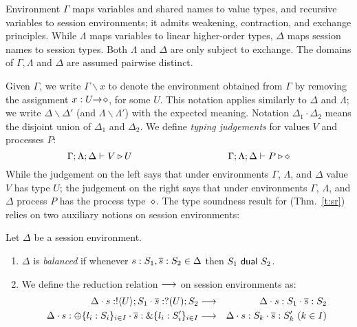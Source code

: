 Environment $\Gamma$ maps variables and shared names to value types, and recursive 
variables to session environments;  
it admits weakening, contraction, and exchange principles.
While  $\Lambda$ maps variables to 
 linear %
higher-order
types, $\Delta$ maps
session names to session types. 
Both $\Lambda$ and $\Delta$ %
are
only subject to exchange.  
The domains of $\Gamma,
\Lambda$ and $\Delta$ are assumed pairwise distinct. 

Given $\Gamma$, we write $\Gamma \backslash x$ to denote the environment obtained from 
 $\Gamma$ by removing the assignment $x:U\!\! \rightarrow\! \diamond$, for some $U$.
This notation applies similarly to $\Delta$ and $\Lambda$; 
we write $\Delta \backslash \Delta'$ (and $\Lambda \backslash \Lambda'$) with the expected meaning.
Notation
$\Delta_1\cdot \Delta_2$ means 
the disjoint union of $\Delta_1$ and $\Delta_2$.  
We define \emph{typing judgements} for values $V$
and processes $P$:
	$$\Gamma; \Lambda; \Delta \vdash V \triangleright U \qquad \qquad \qquad \qquad \qquad \Gamma; \Lambda; \Delta \vdash P \triangleright \diamond$$
While the judgement on the left
says that under environments $\Gamma$, $\Lambda$, and $\Delta$ value $V$
has type $U$; the  judgement on the right says that under
environments $\Gamma$, $\Lambda$, and $\Delta$ process $P$ has the process type~$\diamond$.
The type soundness result for \HOp (Thm.~\ref{t:sr})
relies on two auxiliary notions on session environments: 


\begin{definition}\label{d:wtenvred}%
	Let $\Delta$ be a session environment.
	\begin{enumerate}[$\bullet$]
	\item  $\Delta$ is {\em balanced} if whenever
	$s: S_1, \overline{s}: S_2 \in \Delta$ then $S_1 \ \mathsf{dual}\  S_2$.
	\item We define the reduction relation $\longrightarrow$ on session environments as: %
\begin{eqnarray*}
	\Delta \cat s: \btout{U} S_1 \cat \dual{s}: \btinp{U} S_2  & \red & 
	\Delta \cat s: S_1 \cat \dual{s}: S_2  \\
	\Delta \cat s: \btsel{l_i: S_i}_{i \in I} \cat \dual{s}: \btbra{l_i: S_i'}_{i \in I} &\red& \Delta \cat s: S_k \cat \dual{s}: S_k' \ (k \in I)
\end{eqnarray*}
\end{enumerate}
\end{definition}

